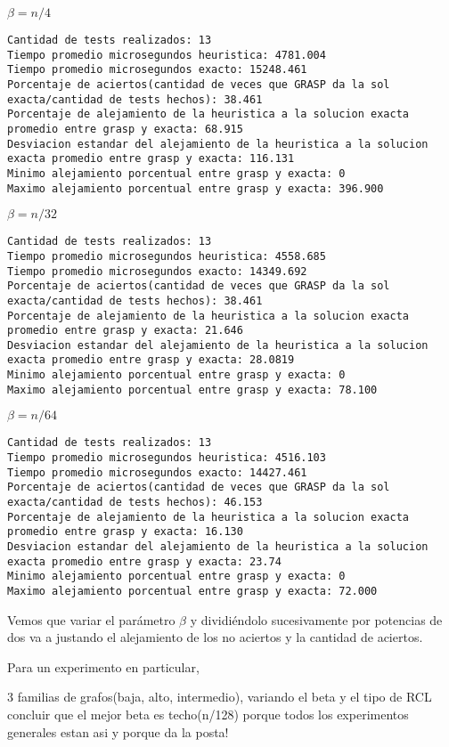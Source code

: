 $\beta= n/4$
\begin{lstlisting}[frame=single]
Cantidad de tests realizados: 13
Tiempo promedio microsegundos heuristica: 4781.004
Tiempo promedio microsegundos exacto: 15248.461
Porcentaje de aciertos(cantidad de veces que GRASP da la sol exacta/cantidad de tests hechos): 38.461
Porcentaje de alejamiento de la heuristica a la solucion exacta promedio entre grasp y exacta: 68.915
Desviacion estandar del alejamiento de la heuristica a la solucion exacta promedio entre grasp y exacta: 116.131
Minimo alejamiento porcentual entre grasp y exacta: 0
Maximo alejamiento porcentual entre grasp y exacta: 396.900
\end{lstlisting}
$\beta=n/32$
\begin{lstlisting}[frame=single]
Cantidad de tests realizados: 13
Tiempo promedio microsegundos heuristica: 4558.685
Tiempo promedio microsegundos exacto: 14349.692
Porcentaje de aciertos(cantidad de veces que GRASP da la sol exacta/cantidad de tests hechos): 38.461
Porcentaje de alejamiento de la heuristica a la solucion exacta promedio entre grasp y exacta: 21.646
Desviacion estandar del alejamiento de la heuristica a la solucion exacta promedio entre grasp y exacta: 28.0819
Minimo alejamiento porcentual entre grasp y exacta: 0
Maximo alejamiento porcentual entre grasp y exacta: 78.100
\end{lstlisting}
$\beta=n/64$
\begin{lstlisting}[frame=single]
Cantidad de tests realizados: 13
Tiempo promedio microsegundos heuristica: 4516.103
Tiempo promedio microsegundos exacto: 14427.461
Porcentaje de aciertos(cantidad de veces que GRASP da la sol exacta/cantidad de tests hechos): 46.153
Porcentaje de alejamiento de la heuristica a la solucion exacta promedio entre grasp y exacta: 16.130
Desviacion estandar del alejamiento de la heuristica a la solucion exacta promedio entre grasp y exacta: 23.74
Minimo alejamiento porcentual entre grasp y exacta: 0
Maximo alejamiento porcentual entre grasp y exacta: 72.000
\end{lstlisting}

Vemos que variar el par\'ametro $\beta$ y dividi\'endolo sucesivamente por potencias de dos va a justando el alejamiento de los no aciertos y la cantidad de aciertos.

\vspace{2mm}

Para un experimento en particular, 

3 familias de grafos(baja, alto, intermedio), variando el beta y el tipo de RCL
concluir que el mejor beta es techo(n/128) porque todos los experimentos generales estan asi y porque da la posta!

